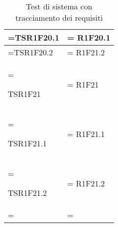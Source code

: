 \begin{xltabular}{\textwidth} {
            >{\hsize\linewidth=\hsize}X
            >{\hsize\linewidth=\hsize}X
        }
        TSR1F20.1 &
        R1F20.1
        \\ \hline

        TSR1F20.2 &
        R1F21.2 
        \\ \hline

        TSR1F21 &
        R1F21
        \\ \hline

        TSR1F21.1 &
        R1F21.1
        \\ \hline

        TSR1F21.2 &
        R1F21.2
        \\ \hline

        \caption{Test di sistema con tracciamento dei requisiti}
    \end{xltabular}

    \pagebreak